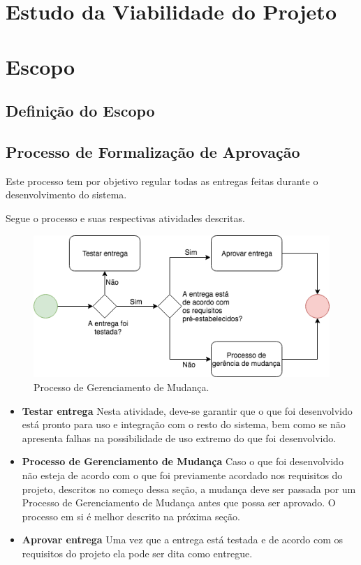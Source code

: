 \section{Estudo da Viabilidade do Projeto}

\section{Escopo}
\subsection{Definição do Escopo}

\subsection{Processo de Formalização de Aprovação}
    Este processo tem por objetivo regular todas as entregas feitas durante o desenvolvimento do sistema.

    Segue o processo e suas respectivas atividades descritas.

\begin{figure}[!ht]
	\centering
		\includegraphics[scale=0.7]{figuras/entrega}
	\caption{Processo de Gerenciamento de Mudança.}
\end{figure}

\begin{itemize}
    \item \textbf{Testar entrega}
        Nesta atividade, deve-se garantir que o que foi desenvolvido está pronto para uso e integração com o resto do sistema, bem como se não apresenta falhas na possibilidade de uso extremo do que foi desenvolvido.

    \item \textbf{Processo de Gerenciamento de Mudança}
        Caso o que foi desenvolvido não esteja de acordo com o que foi previamente acordado nos requisitos do projeto, descritos no começo dessa seção, a mudança deve ser passada por um Processo de Gerenciamento de Mudança antes que possa ser aprovado. O processo em si é melhor descrito na próxima seção.

    \item \textbf{Aprovar entrega}
        Uma vez que a entrega está testada e de acordo com os requisitos do projeto ela pode ser dita como entregue.
\end{itemize}

